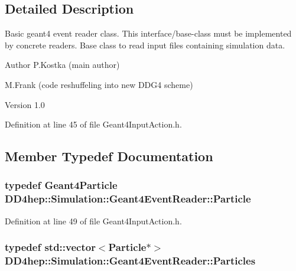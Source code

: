 \subsection{Detailed Description}
Basic geant4 event reader class. This interface/base-\/class must be implemented by concrete readers. Base class to read input files containing simulation data.

\begin{DoxyAuthor}{Author}
P.Kostka (main author) 

M.Frank (code reshuffeling into new DDG4 scheme) 
\end{DoxyAuthor}
\begin{DoxyVersion}{Version}
1.0 
\end{DoxyVersion}


Definition at line 45 of file Geant4InputAction.h.

\subsection{Member Typedef Documentation}
\hypertarget{class_d_d4hep_1_1_simulation_1_1_geant4_event_reader_ad37f7aa722da2299517d66b4568a6a4a}{
\subsubsection[{Particle}]{\setlength{\rightskip}{0pt plus 5cm}typedef {\bf Geant4Particle} {\bf DD4hep::Simulation::Geant4EventReader::Particle}}}
\label{class_d_d4hep_1_1_simulation_1_1_geant4_event_reader_ad37f7aa722da2299517d66b4568a6a4a}


Definition at line 49 of file Geant4InputAction.h.\hypertarget{class_d_d4hep_1_1_simulation_1_1_geant4_event_reader_afa252e93d319aef2810a17aa78bb4603}{
\subsubsection[{Particles}]{\setlength{\rightskip}{0pt plus 5cm}typedef std::vector$<${\bf Particle}$\ast$$>$ {\bf DD4hep::Simulation::Geant4EventReader::Particles}}}
\label{class_d_d4hep_1_1_simulation_1_1_geant4_event_reader_afa252e93d319aef2810a17aa78bb4603}


